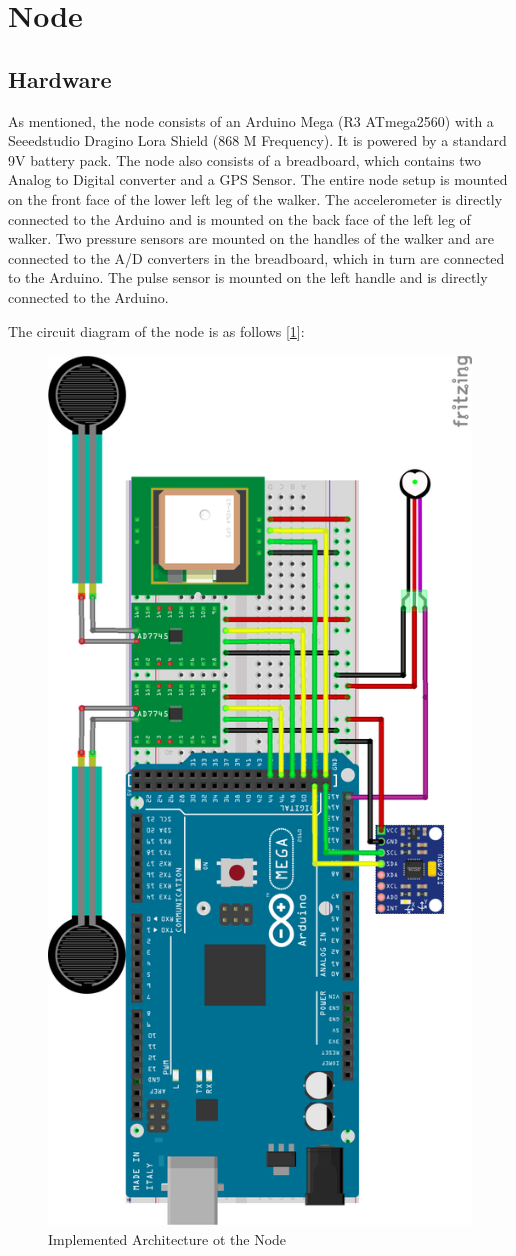 \section{Node} 
	\subsection*{Hardware}
		As mentioned, the node consists of an Arduino Mega (R3 ATmega2560) with a Seeedstudio Dragino Lora Shield (868 M Frequency). It is powered by a standard 9V battery pack. The node also consists of a breadboard, which contains two Analog to Digital converter and a GPS Sensor. The entire node setup is mounted on the front face of the lower left leg of the walker. The accelerometer is directly connected to the Arduino and is mounted on the back face of the left leg of walker. Two pressure sensors are mounted on the handles of the walker and are connected to the A/D converters in the breadboard, which in turn are connected to the Arduino. The pulse sensor is mounted on the left handle and is directly connected to the Arduino.

		The circuit diagram of the node is as follows [\ref{fig:architecture_node}]:

		\begin{figure}[h!]
			\centering
			\includegraphics[width=0.7\linewidth]{gfx/node_diagram}
			\caption{Implemented Architecture ot the Node}
			\label{fig:architecture_node}
		\end{figure}
		
